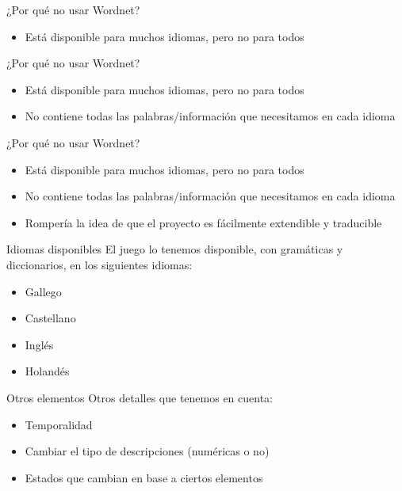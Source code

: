 \begin{tframe}{¿Por qué no usar Wordnet?}
	\begin{itemize}
		\item<+-| alert@+> Está disponible para muchos idiomas, pero no para todos
	\end{itemize}
\end{tframe}

\begin{tframe}{¿Por qué no usar Wordnet?}
	\begin{itemize}
		\item Está disponible para muchos idiomas, pero no para todos
		\item<+-| alert@+> No contiene todas las palabras/información que necesitamos en cada idioma
	\end{itemize}
\end{tframe}

\begin{tframe}{¿Por qué no usar Wordnet?}
	\begin{itemize}
		\item Está disponible para muchos idiomas, pero no para todos
		\item No contiene todas las palabras/información que necesitamos en cada idioma
		\item<+-| alert@+> Rompería la idea de que el proyecto es fácilmente extendible y traducible
	\end{itemize}
\end{tframe}


\begin{frame}[t, fragile]{Idiomas disponibles}
	El juego lo tenemos disponible, con gramáticas y diccionarios, en los siguientes idiomas:
	\begin{itemize}
		\item Gallego
		\item Castellano
		\item Inglés
		\item Holandés
	\end{itemize}
\end{frame}


\begin{tframe}{Otros elementos}
	Otros detalles que tenemos en cuenta:
	\begin{itemize}
		\item Temporalidad
		\item Cambiar el tipo de descripciones (numéricas o no)
		\item Estados que cambian en base a ciertos elementos
	\end{itemize}
\end{tframe}

